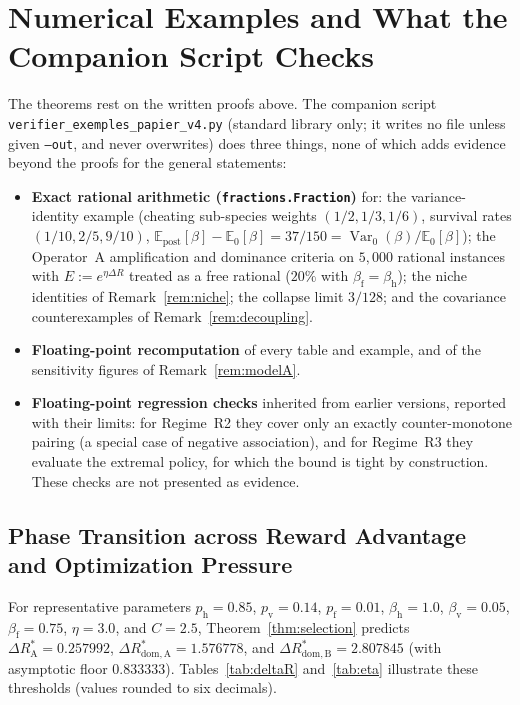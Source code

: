 \documentclass[11pt,a4paper]{article}
\newcommand{\E}{\mathbb{E}}
\newcommand{\Var}{\operatorname{Var}}
\begin{document}
\section{Numerical Examples and What the Companion Script Checks}\label{sec:verif}

The theorems rest on the written proofs above. The companion script \texttt{verifier\_}\allowbreak\texttt{exemples\_}\allowbreak\texttt{papier\_v4.py} (standard library only; it writes no file unless given \texttt{--out}, and never overwrites) does three things, none of which adds evidence beyond the proofs for the general statements:
\begin{itemize}
  \item \textbf{Exact rational arithmetic (\texttt{fractions.Fraction})} for: the variance-identity example (cheating sub-species weights $(1/2, 1/3, 1/6)$, survival rates $(1/10, 2/5, 9/10)$, $\E_{\mathrm{post}}[\beta] - \E_0[\beta] = 37/150 = \Var_0(\beta)/\E_0[\beta]$); the Operator~A amplification and dominance criteria on $5{,}000$ rational instances with $E := e^{\eta\Delta R}$ treated as a free rational ($20\%$ with $\beta_{\mathrm{f}} = \beta_{\mathrm{h}}$); the niche identities of Remark~\ref{rem:niche}; the collapse limit $3/128$; and the covariance counterexamples of Remark~\ref{rem:decoupling}.
  \item \textbf{Floating-point recomputation} of every table and example, and of the sensitivity figures of Remark~\ref{rem:modelA}.
  \item \textbf{Floating-point regression checks} inherited from earlier versions, reported with their limits: for Regime~R2 they cover only an exactly counter-monotone pairing (a special case of negative association), and for Regime~R3 they evaluate the extremal policy, for which the bound is tight by construction. These checks are not presented as evidence.
\end{itemize}

\subsection{Phase Transition across Reward Advantage and Optimization Pressure}

For representative parameters $p_{\mathrm{h}} = 0.85$, $p_{\mathrm{v}} = 0.14$, $p_{\mathrm{f}} = 0.01$, $\beta_{\mathrm{h}} = 1.0$, $\beta_{\mathrm{v}} = 0.05$, $\beta_{\mathrm{f}} = 0.75$, $\eta = 3.0$, and $C = 2.5$, Theorem~\ref{thm:selection} predicts $\Delta R_{\mathrm{A}}^* = 0.257992$, $\Delta R_{\mathrm{dom, A}}^* = 1.576778$, and $\Delta R_{\mathrm{dom, B}}^* = 2.807845$ (with asymptotic floor $0.833333$). Tables~\ref{tab:deltaR} and~\ref{tab:eta} illustrate these thresholds (values rounded to six decimals).
\end{document}
